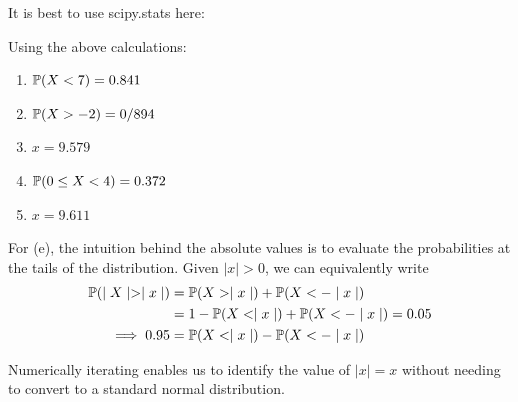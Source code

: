 \documentclass[a4paper]{article}
\begin{document}
\newpage
It is best to use scipy.stats here:

Using the above calculations:

\begin{enumerate}[label=(\alph*)]
	\item \(\mathbb{P}(X < 7) = 0.841\)
	\item \(\mathbb{P}(X > -2) = 0/894\)
	\item \(x = 9.579\)
	\item \(\mathbb{P}(0 \le X < 4) = 0.372\)
	\item \(x = 9.611\)
\end{enumerate}

For (e), the intuition behind the absolute values is to evaluate the probabilities at the tails of the distribution. Given \( \mid x \mid  > 0\), we can equivalently write
\begin{align*}
	\mathbb{P}( \mid X \mid  >  \mid x \mid ) & = \mathbb{P}(X >  \mid x \mid ) + \mathbb{P}(X < - \mid x \mid ) \\
	 & = 1 - \mathbb{P}(X <  \mid x \mid ) + \mathbb{P}(X < - \mid x \mid ) = 0.05 \\
	\implies 0.95 & = \mathbb{P}(X <  \mid x \mid ) - \mathbb{P}(X < - \mid x \mid )
\end{align*}

Numerically iterating enables us to identify the value of \( \mid x \mid  = x\) without needing to convert to a standard normal distribution.
\end{document}
